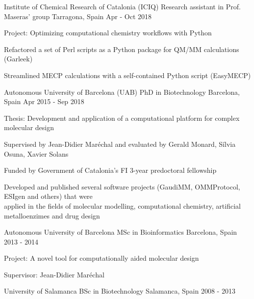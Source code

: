 \begin{cventries}
  \cventry
    {Institute of Chemical Research of Catalonia (ICIQ)} %
    {Research assistant in Prof. Maseras' group} %
    {Tarragona, Spain} %
    {Apr - Oct 2018} %
    {
      \begin{cvitems} %
        \item {Project: Optimizing computational chemistry workflows with Python}
        \item {Refactored a set of Perl scripts as a Python package for QM/MM calculations (Garleek)}
        \item {Streamlined MECP calculations with a self-contained Python script (EasyMECP)\\}
      \end{cvitems}
    }

  \cventry
    {Autonomous University of Barcelona (UAB)} %
    {PhD in Biotechnology} %
    {Barcelona, Spain} %
    {Apr 2015 - Sep 2018} %
    {
      \begin{cvitems} %
        \item {Thesis: Development and application of a computational platform for complex molecular design}
        \item {Supervised by Jean-Didier Maréchal and evaluated by Gerald Monard, Sílvia Osuna, Xavier Solans}
        \item {Funded by Government of Catalonia's FI 3-year predoctoral fellowship}
        \item {Developed and published several software projects (GaudiMM, OMMProtocol, ESIgen and others) that were \\
               applied in the fields of molecular modelling, computational chemistry, artificial metalloenzimes
               and drug design\\}
      \end{cvitems}
  }

  \cventry
    {Autonomous University of Barcelona} %
    {MSc in Bioinformatics} %
    {Barcelona, Spain} %
    {2013 - 2014} %
    {
      \begin{cvitems} %
        \item {Project: A novel tool for computationally aided molecular design}
        \item {Supervisor: Jean-Didier Maréchal\\}
      \end{cvitems}
    }

  \cventry
    {University of Salamanca} %
    {BSc in Biotechnology} %
    {Salamanca, Spain} %
    {2008 - 2013} %
    {~}

\end{cventries}

